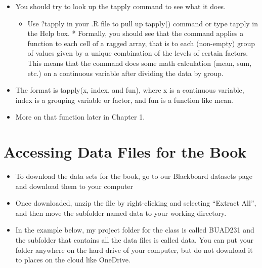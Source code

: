 \documentclass[
  letterpaper,
  DIV=11,
  numbers=noendperiod]{scrreprt}
\providecommand{\tightlist}{%
  \setlength{\itemsep}{0pt}\setlength{\parskip}{0pt}}\usepackage{longtable,booktabs,array}
\begin{document}
\begin{itemize}
\tightlist
\item
  You should try to look up the tapply command to see what it does.

  \begin{itemize}
  \tightlist
  \item
    Use ?tapply in your .R file to pull up tapply() command or type
    tapply in the Help box. * Formally, you should see that the command
    applies a function to each cell of a ragged array, that is to each
    (non-empty) group of values given by a unique combination of the
    levels of certain factors. This means that the command does some
    math calculation (mean, sum, etc.) on a continuous variable after
    dividing the data by group.
  \end{itemize}
\item
  The format is tapply(x, index, and fun), where x is a continuous
  variable, index is a grouping variable or factor, and fun is a
  function like mean.
\item
  More on that function later in Chapter 1.
\end{itemize}


\chapter{Accessing Data Files for the
Book}\label{accessing-data-files-for-the-book}

\begin{itemize}
\tightlist
\item
  To download the data sets for the book, go to our Blackboard datasets
  page and download them to your computer
\item
  Once downloaded, unzip the file by right-clicking and selecting
  ``Extract All'', and then move the subfolder named data to your
  working directory.
\item
  In the example below, my project folder for the class is called
  BUAD231 and the subfolder that contains all the data files is called
  data. You can put your folder anywhere on the hard drive of your
  computer, but do not download it to places on the cloud like OneDrive.
\end{itemize}
\end{document}
